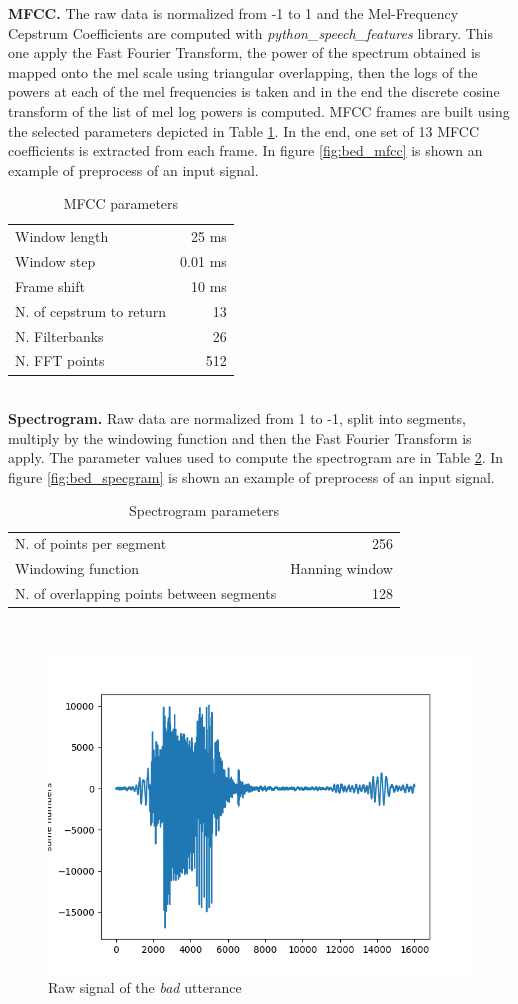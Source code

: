 \noindent \textbf{MFCC.} The raw data is normalized from -1 to 1 and the Mel-Frequency Cepstrum Coefficients are computed with \textit{python\_speech\_features} library. This one apply the Fast Fourier Transform, the power of the spectrum obtained is mapped onto the mel scale using triangular overlapping, then the logs of the powers at each of the mel frequencies is taken and in the end the discrete cosine transform of the list of mel log powers is computed. MFCC frames are built using the selected parameters depicted in Table \ref{table:mfcc_parameters}.
\noindent In the end, one set of 13 MFCC coefficients is extracted from each frame. In figure \ref{fig:bed_mfcc} is shown an example of preprocess of an input signal.
\begin{table}[h]
	\centering
	\begin{tabular}{ lr}
		Window length & 25 ms        \\
		Window step & 0.01 ms        \\
		Frame shift  & 10 ms         \\
		N. of cepstrum to return & 13 \\
		N. Filterbanks & 26         \\
		N. FFT points & 512         \\
		\hline
	\end{tabular}
	\caption{MFCC parameters}
	\label{table:mfcc_parameters} 
\end{table}\\
\noindent \textbf{Spectrogram.} Raw data are normalized from 1 to -1, split into segments, multiply by the windowing function and then the Fast Fourier Transform is apply.
The parameter values used to compute the spectrogram are in Table \ref{table:specgram_parameters}. In figure \ref{fig:bed_specgram} is shown an example of preprocess of an input signal.
\begin{table}[h]
	\centering
	\begin{tabular}{ lr}
		N. of points per segment & 256 \\
		Windowing function & Hanning window \\
		N. of overlapping points between segments & 128 \\
		\hline
	\end{tabular}
	\caption{Spectrogram parameters}
	\label{table:specgram_parameters} 
\end{table}\\

\begin{figure}
	\centering
	\includegraphics[width=.5\textwidth]{img/bed_rawsignal_plot.png}
	\caption{Raw signal of the \textit{bad} utterance}
	\label{fig:bed_rawsignal}
\end{figure}


